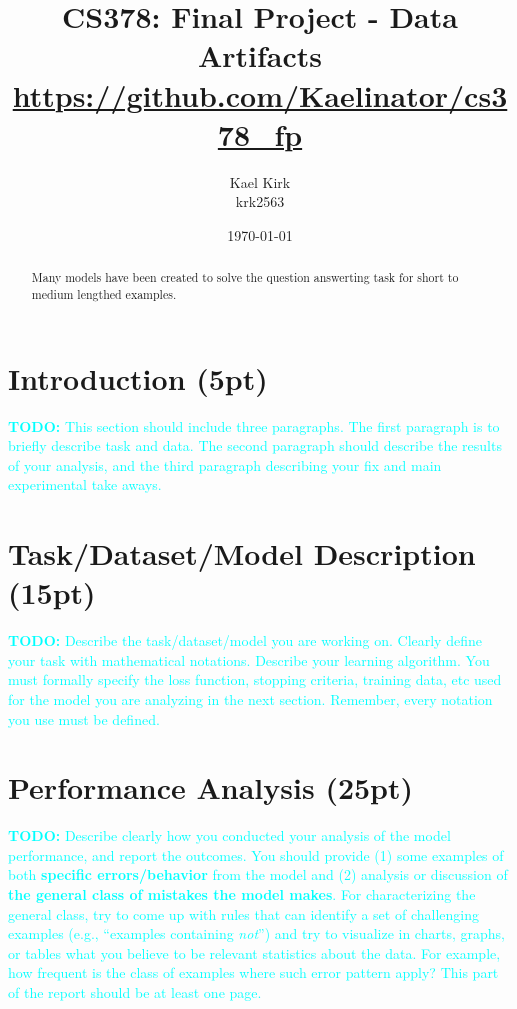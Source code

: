 \documentclass[twocolumn]{article}
\title{CS378: Final Project - Data Artifacts \\ \url{https://github.com/Kaelinator/cs378_fp}}
\author{Kael Kirk \\ krk2563}
\date{\today}
\newcommand{\todo}[1]{\textcolor{cyan}{\textbf{TODO:} #1}}
\begin{document}
\maketitle


\begin{abstract}
  Many models have been created to solve the question answerting task for short
  to medium lengthed examples. 
\end{abstract}

\section{Introduction (5pt)}

\todo{This section should include three paragraphs. The first paragraph is to briefly describe task and data. The second paragraph should describe the results of your analysis, and the third paragraph describing your fix and main experimental take aways. }


\section{Task/Dataset/Model Description (15pt)}

\todo{Describe the task/dataset/model you are working on. Clearly define your task with mathematical notations. Describe your learning algorithm. You must formally specify the loss function, stopping criteria, training data, etc used for the model you are analyzing in the next section. Remember, every notation you use must be defined.}

\section{Performance Analysis (25pt)}

\todo{Describe clearly how you conducted your analysis of the model performance, and report the outcomes. You should provide (1) some examples of both \textbf{specific errors/behavior} from the model and (2) analysis or discussion of \textbf{the general class of mistakes the model makes}. For characterizing the general class, try to come up with rules that can identify a set of challenging examples (e.g., ``examples containing \emph{not}'') and try to visualize in charts, graphs, or tables what you believe to be relevant statistics about the data. For example, how frequent is the class of examples where such error pattern apply? This part of the report should be at least one page.}
\end{document}
